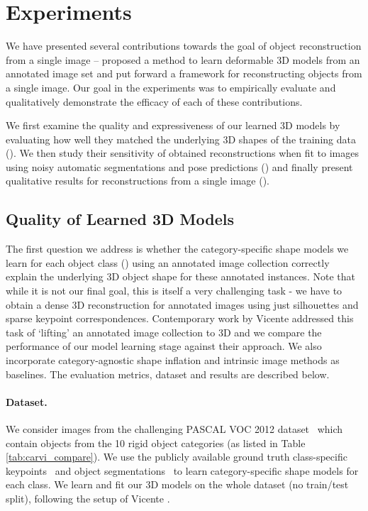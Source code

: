 % 
\section{Experiments}

We have presented several contributions towards the goal of object reconstruction from a single image --  proposed a method to learn deformable 3D models from an annotated image set and  put forward a framework for reconstructing objects from a single image. Our goal in the experiments was to empirically evaluate and qualitatively demonstrate the efficacy of each of these contributions.

We first  examine the quality and expressiveness of our learned 3D models by evaluating how well they matched the underlying 3D shapes of the training data (). We then study their sensitivity of obtained reconstructions when fit to images using noisy automatic segmentations and pose predictions () and finally present qualitative results for reconstructions from a single image ().


\subsection{Quality of Learned 3D Models}
The first question we address is whether the category-specific shape models we learn for each object class () using an annotated image collection correctly explain the underlying 3D object shape for these annotated instances. Note that while it is not our final goal, this is itself a very challenging task - we have to obtain a dense 3D reconstruction for annotated images using just silhouettes and sparse keypoint correspondences. Contemporary work by Vicente \etal \cite{carvi14} addressed this task of `lifting' an annotated image collection to 3D and we compare the performance of our model learning stage against their approach. We also incorporate category-agnostic shape inflation  \cite{twarog2012playing} and intrinsic image \cite{Barron2012B} methods as baselines. The evaluation metrics, dataset and results are described below.


\paragraph{Dataset.} We consider images from the challenging PASCAL VOC 2012 dataset~\cite{pascal-voc-2012} which contain objects from the 10 rigid object categories (as listed in Table \ref{tab:carvi_compare}). We use the publicly available ground truth class-specific keypoints~\cite{bourdevECCV10} and object segmentations~\cite{BharathICCV2011} to learn category-specific shape models for each class. We learn and fit our 3D models on the whole dataset (no train/test split), following the setup of Vicente \etal \cite{carvi14}.

